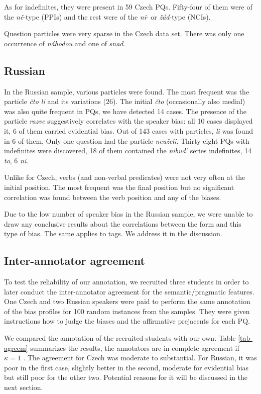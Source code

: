 \documentclass[output=paper,colorlinks,citecolor=brown]{langscibook}
\begin{document}
As for indefinites, they were present in 59 Czech PQs. Fifty-four of them were of the \textit{ně}-type (PPIs) and the rest were of the \textit{ni}- or \textit{žád}-type (NCIs).

Question particles were very sparse in the Czech data set. There was only one occurrence of \textit{náhodou} and one of \textit{snad}.

\subsection{Russian}
In the Russian sample, various particles were found. The most frequent was the particle \textit{čto li} and its variations (26). The initial \textit{čto} (occasionally also medial) was also quite frequent in PQs, we have detected 14 cases. The presence of the particle \textit{razve} suggestively correlates with the speaker bias: all 10 cases displayed it, 6 of them carried evidential bias. Out of 143 cases with particles, \textit{li} was found in 6 of them. Only one question had the particle \textit{neuželi}. Thirty-eight PQs with indefinites were discovered, 18 of them contained the \textit{nibud'} series indefinites, 14 \textit{to}, 6 \textit{ni}. 

Unlike for Czech, verbs (and non-verbal predicates) were not very often at the initial position. The most frequent was the final position but no significant correlation was found between the verb position and any of the biases. 

Due to the low number of speaker bias in the Russian sample, we were unable to draw any conclusive results about the correlations between the form and this type of bias. The same applies to tags. We address it in the discussion. 

\subsection{Inter-annotator agreement} \label{sec-interan}

To test the reliability of our annotation, we recruited three students in order to later conduct the inter-annotator agreement for the semantic/pragmatic features. One Czech and two Russian speakers were paid to perform the same annotation of the bias profiles for 100 random instances from the samples. They were given instructions how to judge the biases and the affirmative prejacents for each PQ.  

We compared the annotation of the recruited students with our own. Table \ref{tab-agreem} summarizes the results, the annotators are in complete agreement if $\kappa = 1$ \citep{cohen60}. The agreement for Czech was moderate to substantial. For Russian, it was poor in the first case, slightly better in the second, moderate for evidential bias but still poor for the other two. Potential reasons for it will be discussed in the next section. 
\end{document}
